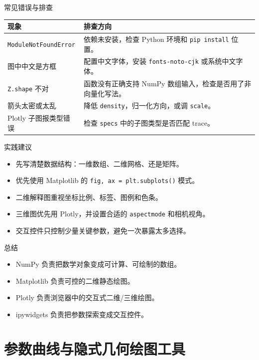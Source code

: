 \documentclass[aspectratio=169,11pt]{ctexbeamer}
\begin{document}
\begin{frame}{常见错误与排查}
  \begin{tabularx}{\linewidth}{@{}lX@{}}
    \toprule
    现象 & 排查方向 \\
    \midrule
    \texttt{ModuleNotFoundError} & 依赖未安装，检查 Python 环境和 \texttt{pip install} 位置。 \\
    图中中文是方框 & 配置中文字体，安装 \texttt{fonts-noto-cjk} 或系统中文字体。 \\
    \texttt{Z.shape} 不对 & 函数没有正确支持 NumPy 数组输入，检查是否用了非向量化写法。 \\
    箭头太密或太乱 & 降低 \texttt{density}，归一化方向，或调 \texttt{scale}。 \\
    Plotly 子图报类型错误 & 检查 \texttt{specs} 中的子图类型是否匹配 trace。 \\
    \bottomrule
  \end{tabularx}
\end{frame}

\begin{frame}{实践建议}
  \begin{itemize}
    \item 先写清楚数据结构：一维数组、二维网格、还是矩阵。
    \item 优先使用 Matplotlib 的 \texttt{fig, ax = plt.subplots()} 模式。
    \item 二维解释图重视坐标比例、标签、图例和色条。
    \item 三维图优先用 Plotly，并设置合适的 \texttt{aspectmode} 和相机视角。
    \item 交互控件只控制少量关键参数，避免一次暴露太多选择。
  \end{itemize}
\end{frame}

\begin{frame}{总结}
  \begin{itemize}
    \item NumPy 负责把数学对象变成可计算、可绘制的数组。
    \item Matplotlib 负责可控的二维静态绘图。
    \item Plotly 负责浏览器中的交互式二维/三维绘图。
    \item ipywidgets 负责把参数探索变成交互控件。
  \end{itemize}
\end{frame}

\section{参数曲线与隐式几何绘图工具}
\end{document}
